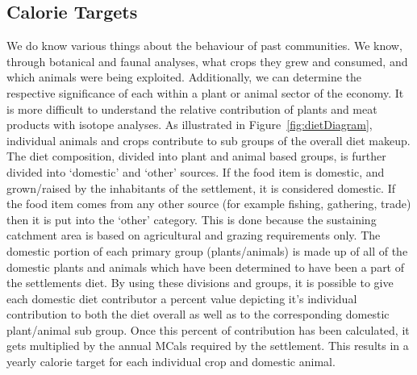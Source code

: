 \subsection{Calorie Targets}
	\label{CalorieTargets}
We do know various things about the behaviour of past communities.  We know, through botanical and faunal analyses, what crops they grew and consumed, and which animals were being exploited.  Additionally, we can determine the respective significance of each within a plant or animal sector of the economy.  It is more difficult to understand the relative contribution of plants and meat products with isotope analyses.  %
As illustrated in Figure~\ref{fig:dietDiagram}, individual animals and crops contribute to sub groups of the overall diet makeup.  The diet composition, divided into plant and animal based groups, is further divided into `domestic' and `other' sources.  If the food item is domestic, and grown/raised by the inhabitants of the settlement, it is considered domestic.  If the food item comes from any other source (for example fishing, gathering, trade) then it is put into the `other' category.  This is done because the sustaining catchment area is based on agricultural and grazing requirements only.
The domestic portion of each primary group (plants/animals) is made up of all of the domestic plants and animals which have been determined to have been a part of the settlements diet.
By using these divisions and groups, it is possible to give each domestic diet contributor a percent value depicting it's individual contribution to both the diet overall as well as to the corresponding domestic plant/animal sub group.  Once this percent of contribution has been calculated, it gets multiplied by the annual MCals required by the settlement.  This results in a yearly calorie target for each individual crop and domestic animal. %

